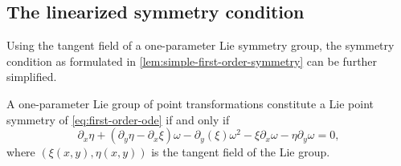 \subsection{The linearized symmetry condition}

Using the tangent field of a one-parameter Lie symmetry group, the symmetry condition as formulated in \cref{lem:simple-first-order-symmetry} can be further simplified.
\begin{lem} \label{lem:linearized-first-order-symmetry}
  A one-parameter Lie group of point transformations constitute a Lie point symmetry of \cref{eq:first-order-ode} if and only if
  \begin{equation*}
    \partial_x \eta + (\partial_y \eta - \partial_x \xi) \omega - \partial_y (\xi) \omega^2 -
    \xi \partial_x \omega - \eta \partial_y \omega = 0,
  \end{equation*}
  where \(\left(\xi(x,y), \eta(x,y)\right)\) is the tangent field of the Lie group.
\end{lem}
